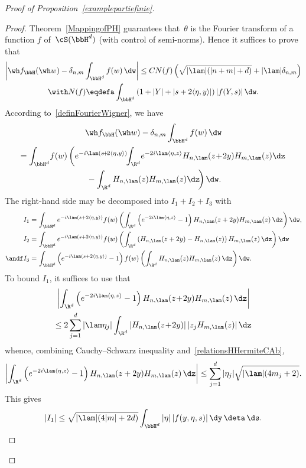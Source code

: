 \begin{proof}[Proof of Proposition~\ref{examplepartiefinie}]
\begin{proof}
Theorem~\ref{MappingofPH} guarantees that~$\theta$ is the Fourier transform of a function $f$ of~$\cS(\bbH^d)$ (with control of semi-norms). Hence it suffices to prove that
\begin{multline*}
\left|\wh f_\bbH(\wh w)-\delta_{n,m}\int_{\bbH^d} f(w)\,\dw\right| \leq CN(f) \left(\sqrt{|\lam|(|n+m|+d)}+|\lam|\delta_{n,m}\right)\\
\with N(f)\eqdefa \int_{\bbH^d} \left(1+|Y| +|s+2\langle \eta,y\rangle|\right) |f(Y,s)| \,\dw.
\end{multline*}
According to~\eqref{definFourierWigner}, we have
\begin{multline*}
\wh f_\bbH(\wh w)-\delta_{n,m}\int_{\bbH^d} f(w)\,\dw \\ =\int_{\bbH^d} \! f(w)\left(e^{-i\lam(s\!+\!2\langle\eta,y\rangle)}\!\!
\int_{\R^d}\!e^{-2i\lam\langle\eta,z\rangle} H_{n,\lam}(z\!+\!2y)H_{m,\lam}(z)\dz\right.\\
\left.{}-\int_{\R^d}H_{n,\lam}(z) H_{m,\lam}(z)\dz\!\right)\dw.
\end{multline*}
The right-hand side may be decomposed into $I_1+I_2+I_3$ with
\[
\begin{aligned}
I_1&=\int_{\bbH^d} e^{-i\lam(s+2\langle\eta,y\rangle)}f(w)
\left(\int_{\R^d} \left(e^{-2i\lam\langle\eta,z\rangle}-1\right)H_{n,\lam}(z+2y)H_{m,\lam}(z)\,\dz\right)\dw,\\
I_2&=\int_{\bbH^d} e^{-i\lam(s+2\langle\eta,y\rangle)}f(w)
\left(\int_{\R^d} \left(H_{n,\lam}(z+2y)-H_{n,\lam}(z)\right)H_{m,\lam}(z)\,\dz\right)\dw\\
\andf I_3&=\int_{\bbH^d} \left(e^{-i\lam(s+2\langle\eta,y\rangle)}-1\right)f(w)\left(\int_{\R^d} H_{n,\lam}(z)H_{m,\lam}(z)\,\dz\right)\dw.
\end{aligned}
\]
To bound $I_1$, it suffices to use that
\begin{multline*}
\left|\int_{\R^d} \left(e^{-2i\lam\langle\eta,z\rangle}-1\right)H_{n,\lam}(z\!+\!2y)H_{m,\lam}(z)\,\dz\right|\\
\leq 2\sum_{j=1}^d |\lam\eta_j| \int_{\R^d} |H_{n,\lam}(z\!+\!2y)|\,|z_j H_{m,\lam}(z)|\,\dz
\end{multline*}
whence, combining Cauchy--Schwarz inequality and~\eqref{relationsHHermiteCAb},
\[
\left|\int_{\R^d} \left(e^{-2i\lam\langle\eta,z\rangle}-1\right)H_{n,\lam}(z+2y)H_{m,\lam}(z)\,\dz\right|
\leq \sum_{j=1}^d |\eta_j| \sqrt{|\lam|(4m_j+2)}.
\]
This gives
\begin{equation}\label{eq:I1}
|I_1|\leq \sqrt{|\lam|(4|m|+2d)}\int_{\bbH^d} |\eta|\,|f(y,\eta,s)|\,\dy\,\deta\,\ds.

\end{equation}
\end{proof}
\end{proof}
